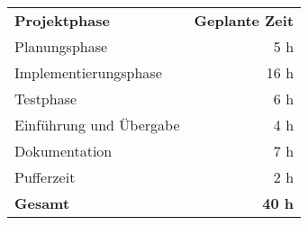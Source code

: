 \begin{tabular}{lr}
\rowcolor{heading}\textbf{Projektphase} & \textbf{Geplante Zeit} \\
Planungsphase & 5 h \\
\rowcolor{odd}Implementierungsphase & 16 h \\
Testphase & 6 h \\
\rowcolor{odd}Einführung und Übergabe & 4 h \\
Dokumentation & 7 h\\
\rowcolor{odd}Pufferzeit & 2 h \\
\hline
\hline
\rowcolor{odd}\textbf{Gesamt} & \textbf{40 h} \\
\end{tabular}